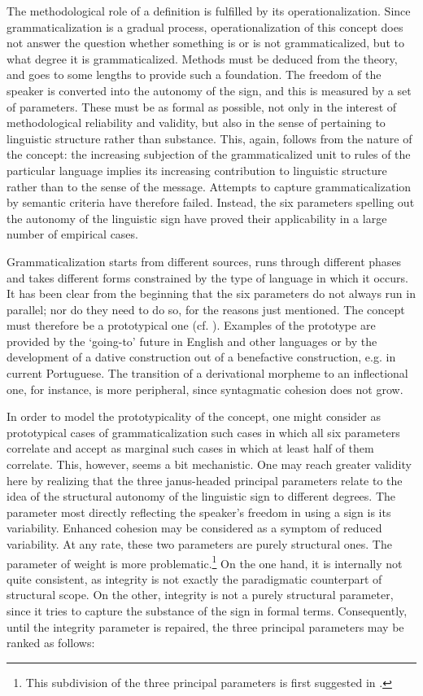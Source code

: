 The methodological role of a definition is fulfilled by its operationalization. Since grammaticalization is a gradual process, operationalization of this concept does not answer the question whether something is or is not grammaticalized, but to what degree it is grammaticalized. Methods must be deduced from the theory, and  goes to some lengths to provide such a foundation. The freedom of the speaker is converted into the autonomy of the sign, and this is measured by a set of parameters. These must be as formal as possible, not only in the interest of methodological reliability and validity, but also in the sense of pertaining to linguistic structure rather than substance. This, again, follows from the nature of the concept: the increasing subjection of the grammaticalized unit to rules of the particular language implies its increasing contribution to linguistic structure rather than to the sense of the message. Attempts to capture grammaticalization by semantic criteria have therefore failed. Instead, the six parameters spelling out the autonomy of the linguistic sign have proved their applicability in a large number of empirical cases. 

Grammaticalization starts from different sources, runs through different phases and takes different forms constrained by the type of language in which it occurs. It has been clear from the beginning that the six parameters do not always run in parallel; nor do they need to do so, for the reasons just mentioned. The concept must therefore be a prototypical one (cf. \citealt{Wiemer2014}). Examples of the prototype are provided by the ‘going-to’ future in English and other languages or by the development of a dative construction out of a benefactive construction, e.g. in current Portuguese. The transition of a derivational morpheme to an inflectional one, for instance, is more peripheral, since syntagmatic cohesion does not grow.

In order to model the prototypicality of the concept, one might consider as prototypical cases of grammaticalization such cases in which all six parameters correlate and accept as marginal such cases in which at least half of them correlate. This, however, seems a bit mechanistic. One may reach greater validity here by realizing that the three janus-headed principal parameters relate to the idea of the structural autonomy of the linguistic sign to different degrees. The parameter most directly reflecting the speaker’s freedom in using a sign is its variability. Enhanced cohesion may be considered as a symptom of reduced variability. At any rate, these two parameters are purely structural ones. The parameter of weight is more problematic.\footnote{This subdivision of the three principal parameters is first suggested in \citet{Lehmann1995}.} On the one hand, it is internally not quite consistent, as integrity is not exactly the paradigmatic counterpart of structural scope. On the other, integrity is not a purely structural parameter, since it tries to capture the substance of the sign in formal terms. Consequently, until the integrity parameter is repaired, the three principal parameters may be ranked as follows:

